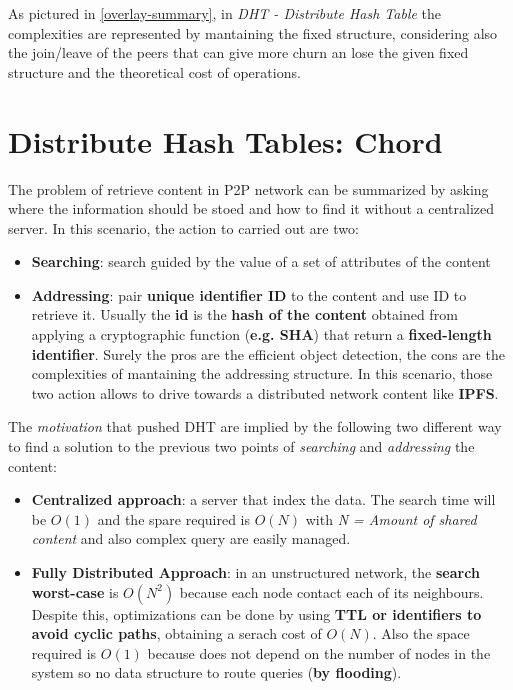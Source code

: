 \documentclass[10pt,a4paper]{report}
\begin{document}
As pictured in \ref{overlay-summary}, in \textit{DHT - Distribute Hash Table} the complexities are represented by mantaining the fixed structure, considering also the join/leave of the peers that can give more churn an lose the given fixed structure and the   theoretical cost of operations.



\section{Distribute Hash Tables: Chord}\label{sec:introduction-to-distributed-hash-tables}
The problem of retrieve content in P2P network can be summarized by asking where the information should be stoed and how to find it without a centralized server.
In this scenario, the action to carried out are two:
\begin{itemize}
	\item 
	\textbf{Searching}: search guided by the value of a set of attributes of the content
	\item 
	\textbf{Addressing}: pair \textbf{unique identifier ID} to the content and use ID to retrieve it. Usually the \textbf{id} is the \textbf{hash of the content} obtained from applying a cryptographic function (\textbf{e.g. SHA}) that return a \textbf{fixed-length identifier}.
	Surely the pros are the efficient object detection, the cons are the complexities of mantaining the addressing structure.
	In this scenario, those two action allows to drive towards a distributed network content like \textbf{IPFS}.
\end{itemize}
The \textit{motivation} that pushed DHT are implied by the following two different way to find a solution to the previous two points of \textit{searching} and \textit{addressing} the content:
\begin{itemize}
	\item 
	\textbf{Centralized approach}: a server that index the data. The search time will be $O(1)$ and the spare required is $O(N)$ with \textit{N =  Amount of shared content} and also complex query are easily managed.
	\item 
	\textbf{Fully Distributed Approach}: in an unstructured network, the \textbf{search worst-case} is $O(N^{2})$ because each node contact each of its neighbours. Despite this, optimizations can be done by using \textbf{TTL or identifiers to avoid cyclic paths}, obtaining a serach cost of $O(N)$.
	Also the space required is $O(1)$ because does not depend on the number of nodes in the system so no data structure to route queries (\textbf{by flooding}).
\end{itemize}
\end{document}
